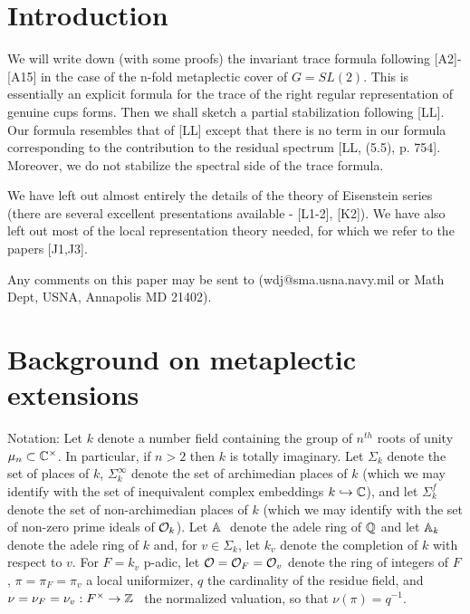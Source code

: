 \section{Introduction}

We will write down (with some proofs) the invariant trace
formula following [A2]-[A15] in the case of the
n-fold metaplectic cover of $G=SL(2)$.
This is essentially an explicit formula for the trace of
the right regular representation of
genuine cups forms.
Then we shall sketch a partial stabilization following [LL].
Our formula resembles that of [LL] except that there
is no term in our formula corresponding to the
contribution to the residual spectrum
[LL, (5.5), p. 754]. Moreover, we do not stabilize the spectral
side of the trace formula.

We have left out almost entirely the details of the theory of
Eisenstein
series (there are several excellent presentations available -
[L1-2], [K2]). We have also left out most of the
local representation theory needed, for which we refer to the
papers [J1,J3].

Any comments on this paper may be sent to
(wdj@sma.usna.navy.mil or Math Dept, USNA, Annapolis MD 21402).

\section{Background on metaplectic extensions}

Notation: Let $k$ denote a number field containing the group of $n^{th}$
roots of unity $\mu _n\subset {\Bbb{C}}^{\times }$. In particular, if $n>2$
then $k$ is totally imaginary. Let $\Sigma _k$ denote the set of places of $k
$, $\Sigma _k^\infty $ denote the set of archimedian places of $k$ (which we
may identify with the set of inequivalent complex embeddings $k\hookrightarrow 
{\Bbb{C}}$), and let $\Sigma _k^f$ denote the set of non-archimedian places of 
$k$ (which we may identify with the set of non-zero prime ideals of $%
{\cal{O}}_k$). Let ${\Bbb{A}}$ $\;$denote the adele ring of ${\Bbb{Q}}$ and
let ${\Bbb{A}}_k$ denote the adele ring of $k$ and, for $v\in \Sigma _k$, let $%
k_v$ denote the completion of $k$ with respect to $v$. For $F=k_v$ p-adic,
let ${\cal{O}}={\cal{O}}_F={\cal{O}}_v$ denote the ring of integers of 
$F$, $\pi =\pi _F=\pi _v$ a local uniformizer, $q$ the cardinality of the
residue field, and $\nu =\nu _F=\nu _v:F^{\times }\rightarrow {\Bbb{Z}}$ \ the
normalized valuation, so that $\nu (\pi )=q^{-1}$.

